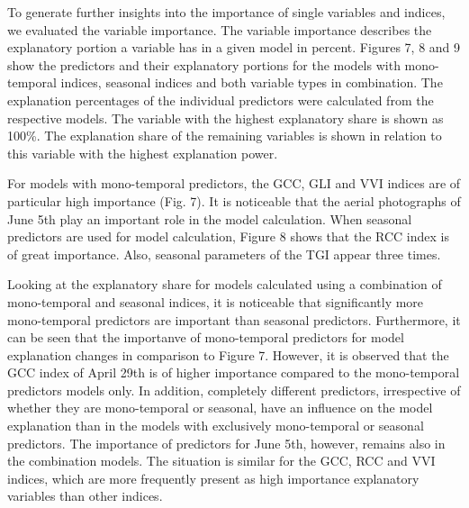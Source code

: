 \documentclass[]{article}
\begin{document}
To generate further insights into the importance of single variables and
indices, we evaluated the variable importance. The variable importance
describes the explanatory portion a variable has in a given model in
percent. Figures 7, 8 and 9 show the predictors and their explanatory
portions for the models with mono-temporal indices, seasonal indices and
both variable types in combination. The explanation percentages of the
individual predictors were calculated from the respective models. The
variable with the highest explanatory share is shown as 100\%. The
explanation share of the remaining variables is shown in relation to
this variable with the highest explanation power.

For models with mono-temporal predictors, the GCC, GLI and VVI indices
are of particular high importance (Fig. 7). It is noticeable that the
aerial photographs of June 5th play an important role in the model
calculation. When seasonal predictors are used for model calculation,
Figure 8 shows that the RCC index is of great importance. Also, seasonal
parameters of the TGI appear three times.

Looking at the explanatory share for models calculated using a
combination of mono-temporal and seasonal indices, it is noticeable that
significantly more mono-temporal predictors are important than seasonal
predictors. Furthermore, it can be seen that the importanve of
mono-temporal predictors for model explanation changes in comparison to
Figure 7. However, it is observed that the GCC index of April 29th is of
higher importance compared to the mono-temporal predictors models only.
In addition, completely different predictors, irrespective of whether
they are mono-temporal or seasonal, have an influence on the model
explanation than in the models with exclusively mono-temporal or
seasonal predictors. The importance of predictors for June 5th, however,
remains also in the combination models. The situation is similar for the
GCC, RCC and VVI indices, which are more frequently present as high
importance explanatory variables than other indices.
\end{document}
